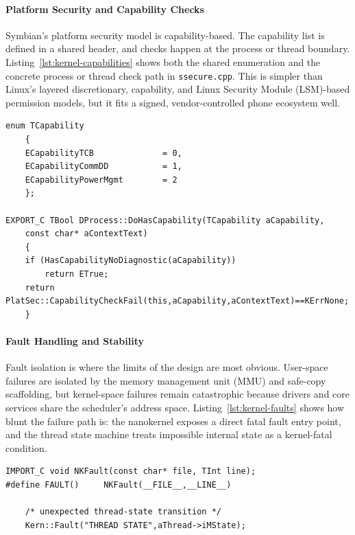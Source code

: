 \paragraph{Platform Security and Capability Checks}

Symbian's platform security model is capability-based. The capability list is
defined in a shared header, and checks happen at the process or thread
boundary. Listing~\ref{lst:kernel-capabilities} shows both the shared
enumeration and the concrete process or thread check path in
\texttt{ssecure.cpp}. This is simpler than Linux's layered discretionary,
capability, and Linux Security Module (LSM)-based permission models, but it
fits a signed, vendor-controlled phone ecosystem well.

\begin{listing}[H]
\begin{verbatim}
enum TCapability
	{
	ECapabilityTCB				= 0,
	ECapabilityCommDD			= 1,
	ECapabilityPowerMgmt		= 2
	};

EXPORT_C TBool DProcess::DoHasCapability(TCapability aCapability,
	const char* aContextText)
	{
	if (HasCapabilityNoDiagnostic(aCapability))
		return ETrue;
	return PlatSec::CapabilityCheckFail(this,aCapability,aContextText)==KErrNone;
	}
\end{verbatim}
\caption{Capability definitions and kernel-side capability enforcement. Files:
\texttt{e32capability.h} and \texttt{ssecure.cpp}.}
\label{lst:kernel-capabilities}
\end{listing}

\paragraph{Fault Handling and Stability}

Fault isolation is where the limits of the design are most obvious. User-space
failures are isolated by the memory management unit (MMU) and safe-copy
scaffolding, but kernel-space failures remain catastrophic because drivers and
core services share the scheduler's address space. Listing~\ref{lst:kernel-faults}
shows how blunt the failure path is: the nanokernel exposes a direct fatal
fault entry point, and the thread state machine treats impossible internal
state as a kernel-fatal condition.

\begin{listing}[H]
\begin{verbatim}
IMPORT_C void NKFault(const char* file, TInt line);
#define FAULT()		NKFault(__FILE__,__LINE__)

	/* unexpected thread-state transition */
	Kern::Fault("THREAD STATE",aThread->iMState);
\end{verbatim}
\caption{Kernel-fatal fault paths for nanokernel and thread-state corruption.
Files: \texttt{nkern.h} and \texttt{sthread.cpp}.}
\label{lst:kernel-faults}
\end{listing}

